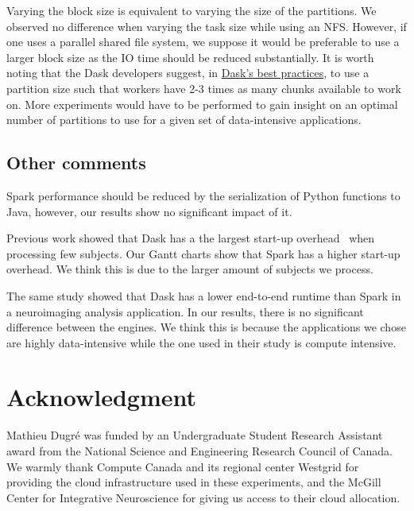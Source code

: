 \documentclass[conference]{IEEEtran}
\newcommand{\TG}[1]{\color{cyan}From Tristan: #1 \color{black}}
\begin{document}
Varying the block size is equivalent to varying the size of the partitions. We
observed no difference when varying the task size while using an NFS. However, if
one uses a parallel shared file system, we suppose it would be preferable to use a
larger block size as the IO time should be reduced substantially. It is worth noting
that the Dask developers suggest, in
\href{https://docs.dask.org/en/latest/best-practices.html}{Dask's best practices}, to
use a partition size such that workers have 2-3 times as many chunks available to
work on. More experiments would have to be performed to gain insight on an optimal
number of partitions to use for a given set of data-intensive applications.

\subsection{Other comments}
Spark performance should be reduced by the serialization of Python functions to Java,
however, our results show no significant impact of it. 

Previous work showed that Dask has a the largest start-up overhead~\cite{Mehta:17}
when processing few subjects. Our Gantt charts show that Spark has a higher start-up
overhead. We think this is due to the larger amount of subjects we process.

The same study showed that Dask has a lower end-to-end runtime than Spark in a
neuroimaging analysis application. In our results, there is no significant difference
between the engines. We think this is because the applications we chose are highly
data-intensive while the one used in their study is compute intensive.




\section*{Acknowledgment}

Mathieu Dugr\'e was funded by an Undergraduate Student Research Assistant award from
the National Science and Engineering Research Council of Canada. We warmly thank
Compute Canada and its regional center Westgrid for providing the cloud infrastructure used in
these experiments, and the McGill Center for Integrative Neuroscience for giving us
access to their cloud allocation.



\end{document}
